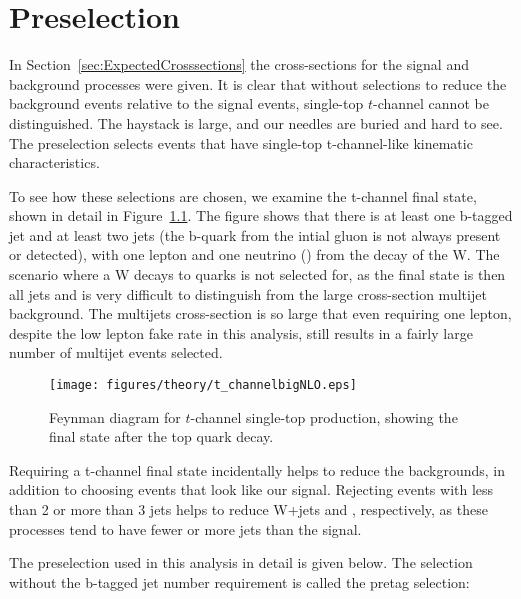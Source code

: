 \chapter{Preselection}
 \label{sec:EventSelection}
In Section~\ref{sec:ExpectedCrosssections} the cross-sections for the signal and background processes were given.  It is clear that without selections to reduce the background events relative to the signal events, single-top $t$-channel cannot be distinguished.  The haystack is large, and our needles are buried and hard to see.  The preselection selects events that have single-top t-channel-like kinematic characteristics.

To see how these selections are chosen, we examine the t-channel final state, shown in detail in Figure~\ref{fig:Feynman_tchan}.  The figure shows that there is at least one b-tagged jet and at least two jets (the b-quark from the intial gluon is not always present or detected), with one lepton and one neutrino (\met) from the decay of the W.  The scenario where a W decays to quarks is not selected for, as the final state is then all jets and is very difficult to distinguish from the large cross-section multijet background.  The multijets cross-section is so large that even requiring one lepton, despite the low lepton fake rate in this analysis, still results in a fairly large number of multijet events selected.

\begin{figure}[!h!tpb]
 \centering
 \texttt{[image: figures/theory/t\_channelbigNLO.eps]}
\vspace{-0.5cm}
 \caption{Feynman diagram for $t$-channel single-top production, showing the final state after the top quark decay.}
 \label{fig:Feynman_tchan}
 \end{figure}

Requiring a t-channel final state incidentally helps to reduce the backgrounds, in addition to choosing events that look like our signal.  Rejecting events with less than 2 or more than 3 jets helps to reduce W+jets and \ttbar, respectively, as these processes tend to have fewer or more jets than the signal.  

The preselection used in this analysis in detail is given below.  The selection without the b-tagged jet number requirement is called the pretag selection:

